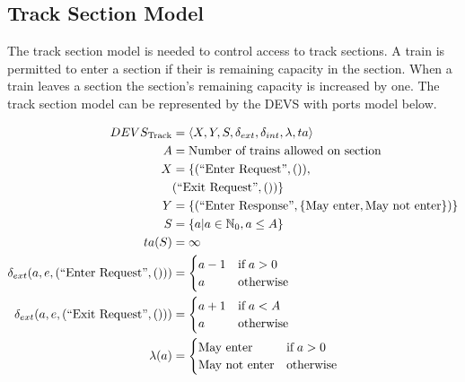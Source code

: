 \subsection{Track Section Model}

The track section model is needed to control access to track sections. A train
is permitted to enter a section if their is remaining capacity in the section.
When a train leaves a section the section's remaining capacity is increased by
one. The track section model can be represented by the DEVS with ports model 
below.

\newcommand{\InEnterReq}[0]{(\text{``Enter Request''}, ())}
\newcommand{\InExitReq}[0]{(\text{``Exit Request''}, ())}

\newcommand{\OutEnterRes}[1]{(\text{``Enter Response''}, #1)}

\begin{align*}
DEVS_{\textrm{Track}} &= \left<X,Y,S,\delta_{ext},\delta_{int},\lambda,ta\right> \\
    A &= \text{Number of trains allowed on section} \\
    X &= \{\InEnterReq, \\
        & \InExitReq
    \} \\
    Y &= \{\OutEnterRes{\{\text{May enter}, \text{May not enter}\}}\} \\
    S &= \{ a | a \in \mathbb{N}_0, a \leq A \} \\
    ta(S) &= \infty \\
    \delta_{ext}(a, e, \InEnterReq) &= 
        \begin{cases}
            a - 1 & \text{if\;} a > 0 \\
            a & \text{otherwise} \\
        \end{cases} \\
    \delta_{ext}(a, e, \InExitReq) &= 
        \begin{cases}
            a + 1 & \text{if\;} a < A \\
            a & \text{otherwise} \\
        \end{cases} \\
    \lambda(a) &= 
        \begin{cases}
            \text{May enter} & \text{if\;} a > 0 \\
            \text{May not enter} & \text{otherwise} \\
        \end{cases}
\end{align*}

